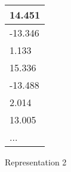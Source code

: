 \begin{figure}
	\centering
	\begin{tabular}{ | l | }
		\hline
		14.451 \\ \hline
		-13.346 \\ \hline
		1.133 \\ \hline
		15.336 \\ \hline
		-13.488 \\ \hline
		2.014 \\ \hline
		13.005 \\ \hline
		... \\ \hline
	\end{tabular}
	\caption{Representation 2}
	\label{fig:representation2}
\end{figure}